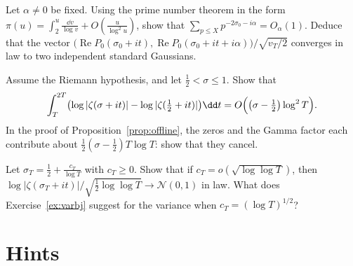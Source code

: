 \begin{exercise}[$\star\star\star$]\label{ex:twopoint}
Let $\alpha\ne0$ be fixed. Using the prime number theorem in the form $\pi(u)=\int_2^u\frac{\dd v}{\log v}+O(\frac u{\log^2u})$, show that $\sum_{p\le X}p^{-2\sigma_0-i\alpha}=O_\alpha(1)$. Deduce that the vector $\bigl(\operatorname{Re}P_0(\sigma_0+it),\operatorname{Re}P_0(\sigma_0+it+i\alpha)\bigr)/\sqrt{v_T/2}$ converges in law to two independent standard Gaussians.
\end{exercise}

\begin{exercise}[$\star\star\star$]\label{ex:meandiff}
Assume the Riemann hypothesis, and let $\frac12<\sigma\le1$. Show that
\[
\int_T^{2T}\bigl(\log|\zeta(\sigma+it)|-\log|\zeta(\tfrac12+it)|\bigr)\dd t=O\Bigl(\bigl(\sigma-\tfrac12\bigr)\log^2T\Bigr).
\]
In the proof of Proposition~\ref{prop:offline}, the zeros and the Gamma factor each contribute about $\frac12(\sigma-\frac12)T\log T$: show that they cancel.
\end{exercise}

\begin{exercise}[$\star$]\label{ex:fixedW}
Let $\sigma_T=\frac12+\frac{c_T}{\log T}$ with $c_T\ge0$. Show that if $c_T=o(\sqrt{\log\log T})$, then $\log|\zeta(\sigma_T+it)|/\sqrt{\frac12\log\log T}\to\mathcal N(0,1)$ in law. What does Exercise~\ref{ex:varbj} suggest for the variance when $c_T=(\log T)^{1/2}$?
\end{exercise}

\section{Hints}

